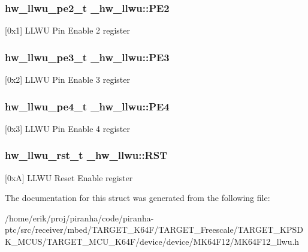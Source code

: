 \subsubsection[{\texorpdfstring{P\+E2}{PE2}}]{ {\bf hw\+\_\+llwu\+\_\+pe2\+\_\+t} \+\_\+hw\+\_\+llwu\+::\+P\+E2}\hypertarget{struct__hw__llwu_a6745bd0c612c7272886c21d303d37973}{}\label{struct__hw__llwu_a6745bd0c612c7272886c21d303d37973}
\mbox{[}0x1\mbox{]} L\+L\+WU Pin Enable 2 register 
\subsubsection[{\texorpdfstring{P\+E3}{PE3}}]{ {\bf hw\+\_\+llwu\+\_\+pe3\+\_\+t} \+\_\+hw\+\_\+llwu\+::\+P\+E3}\hypertarget{struct__hw__llwu_a0261c5c9bb1706337c4cc90ce2a46282}{}\label{struct__hw__llwu_a0261c5c9bb1706337c4cc90ce2a46282}
\mbox{[}0x2\mbox{]} L\+L\+WU Pin Enable 3 register 
\subsubsection[{\texorpdfstring{P\+E4}{PE4}}]{ {\bf hw\+\_\+llwu\+\_\+pe4\+\_\+t} \+\_\+hw\+\_\+llwu\+::\+P\+E4}\hypertarget{struct__hw__llwu_a5235d0d009bb58cc911218ca4ee6c6a7}{}\label{struct__hw__llwu_a5235d0d009bb58cc911218ca4ee6c6a7}
\mbox{[}0x3\mbox{]} L\+L\+WU Pin Enable 4 register 
\subsubsection[{\texorpdfstring{R\+ST}{RST}}]{ {\bf hw\+\_\+llwu\+\_\+rst\+\_\+t} \+\_\+hw\+\_\+llwu\+::\+R\+ST}\hypertarget{struct__hw__llwu_a59e2cbe447901fec76eb71487e74b888}{}\label{struct__hw__llwu_a59e2cbe447901fec76eb71487e74b888}
\mbox{[}0xA\mbox{]} L\+L\+WU Reset Enable register 

The documentation for this struct was generated from the following file\+:\begin{DoxyCompactItemize}
\item 
/home/erik/proj/piranha/code/piranha-\/ptc/src/receiver/mbed/\+T\+A\+R\+G\+E\+T\+\_\+\+K64\+F/\+T\+A\+R\+G\+E\+T\+\_\+\+Freescale/\+T\+A\+R\+G\+E\+T\+\_\+\+K\+P\+S\+D\+K\+\_\+\+M\+C\+U\+S/\+T\+A\+R\+G\+E\+T\+\_\+\+M\+C\+U\+\_\+\+K64\+F/device/device/\+M\+K64\+F12/M\+K64\+F12\+\_\+llwu.\+h\end{DoxyCompactItemize}
